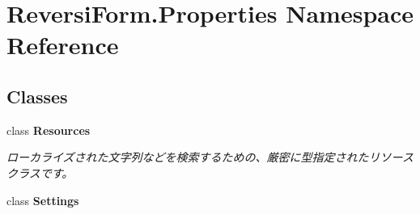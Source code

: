 \hypertarget{namespace_reversi_form_1_1_properties}{}\section{Reversi\+Form.\+Properties Namespace Reference}
\label{namespace_reversi_form_1_1_properties}
\subsection*{Classes}
\begin{DoxyCompactItemize}
\item 
class {\bfseries Resources}
\begin{DoxyCompactList}\small\item\em ローカライズされた文字列などを検索するための、厳密に型指定されたリソース クラスです。 \end{DoxyCompactList}\item 
class {\bfseries Settings}
\end{DoxyCompactItemize}

